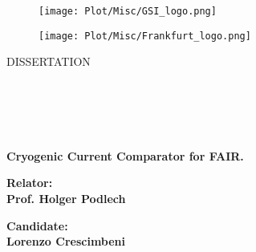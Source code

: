 \documentclass[12pt,a4paper]{report}
\begin{document}
	\begin{titlepage} %
		\begin{figure}[t] %
			\begin{minipage}[t]{0.5\textwidth}\raggedleft
				
				\centering\texttt{[image: Plot/Misc/GSI\_logo.png]}
			\end{minipage}
			\begin{minipage}[t]{0.5\textwidth}\raggedright
				
				\centering\texttt{[image: Plot/Misc/Frankfurt\_logo.png]}
			\end{minipage}
		\end{figure}
		\vspace{200mm}
		
		\begin{Large}
			\begin{center}
				\vspace{40mm}
				{\LARGE{DISSERTATION}}\\
				\vspace{20mm} 
				\\
				 \\
				\vspace{20mm}
				\\
				\\
				\\
				\vspace{10mm}
				{\huge{\bf Cryogenic Current Comparator for FAIR.}}\\
			\end{center}
		\end{Large}
		
		
		\vspace{36mm}
		\begin{minipage}[t]{0.47\textwidth}
			{\large{\bf Relator:\\ Prof. Holger Podlech}}
			
		\end{minipage}
		\hfill
		\begin{minipage}[t]{0.47\textwidth}\raggedleft
			{\large{\bf Candidate: \\ Lorenzo Crescimbeni\\ }}
		\end{minipage}
		
		\vspace{10mm}
		
		\hrulefill
		
		\vspace{5mm}
		
		
	\end{titlepage}
\end{document}
